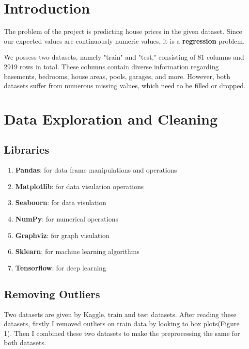 \section{Introduction}

The problem of the project is predicting house prices in the given dataset. Since our expected values are continuously numeric values, it is a \textbf{regression} problem.\newline

We possess two datasets, namely "train" and "test," consisting of 81 columns and 2919 rows in total. These columns contain diverse information regarding basements, bedrooms, house areas, pools, garages, and more. However, both datasets suffer from numerous missing values, which need to be filled or dropped.
\newpage
\section{Data Exploration and Cleaning}
\subsection{Libraries}
\begin{enumerate}[]
  \item \textbf{Pandas}: for data frame manipulations and operations
  \item \textbf{Matplotlib}: for data visulation operations
\item \textbf{Seaboorn}: for data visulation
\item \textbf{NumPy}: for numerical operations
\item \textbf{Graphviz}: for graph  visulation 
\item \textbf{Sklearn}: for  machine learning algorithms
\item \textbf{Tensorflow}: for  deep learning



  
\end{enumerate}

\subsection{Removing Outliers}
Two datasets are given by Kaggle, train and test datasets. After reading these datasets, firstly I removed outliers on train data by looking to box plots(Figure 1). Then I combined these two datasets to make the preprocessing the same for both datasets.



